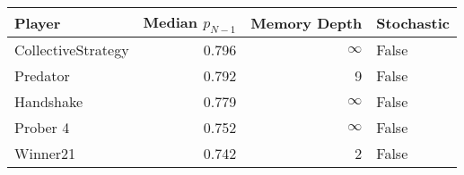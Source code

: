 \begin{tabular}{lrrl}
\toprule
             Player &  Median $p_{N-1}$ &  Memory Depth & Stochastic \\
\midrule
 CollectiveStrategy &             0.796 &            \(\infty\) &      False \\
           Predator &             0.792 &             9 &      False \\
          Handshake &             0.779 &            \(\infty\) &      False \\
           Prober 4 &             0.752 &            \(\infty\) &      False \\
           Winner21 &             0.742 &             2 &      False \\
\bottomrule
\end{tabular}
